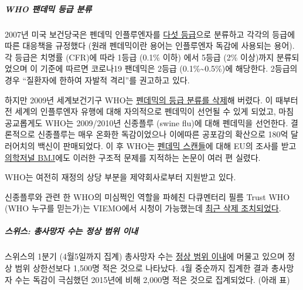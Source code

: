\hypertarget{who-uxd32cuxb370uxbbf9-uxb4f1uxae09-uxbd84uxb958}{%
\subparagraph{\texorpdfstring{\textbf{WHO 팬데믹 등급
분류}}{WHO 팬데믹 등급 분류}}\label{who-uxd32cuxb370uxbbf9-uxb4f1uxae09-uxbd84uxb958}}

2007년 미국 보건당국은 펜데믹 인플루엔자를
\href{https://www.forbes.com/2010/02/05/world-health-organization-swine-flu-pandemic-opinions-contributors-michael-fumento.html\#1806e16948e8}{다섯
등급}으로 분류하고 각각의 등급에 따른 대응책을 규정했다 (원래 펜데믹이란
용어는 인플루엔자 독감에 사용되는 용어). 각 등급은 치명률 (CFR)에 따라
1등급 (0.1\% 이하) 에서 5등급 (2\% 이상)까지 분류되었으며 이 기준에
따르면 코로나19 팬데믹은 2등급 (0.1\%\textasciitilde{}0.5\%)에 해당한다.
2등급의 경우 ``질환자에 한하여 자발적 격리''를 권고하고 있다.

하지만 2009년 세계보건기구 WHO는
\href{https://www.forbes.com/2010/02/05/world-health-organization-swine-flu-pandemic-opinions-contributors-michael-fumento.html\#1806e16948e8}{펜데믹의
등급 분류를 삭제}해 버렸다. 이 때부터 전 세계의 인플루엔자 유행에 대해
자의적으로 펜데믹이 선언될 수 있게 되었고, 마침 공교롭게도 WHO는
2009/2010년 신종플루 (swine flu)에 대해 펜데믹을 선언한다. 결론적으로
신종플루는 매우 온화한 독감이었으나 이에따른 공포감의 확산으로 180억
달러어치의 백신이 판매되었다. 이 후 WHO는
\href{https://healthcare-in-europe.com/en/news/european-parliament-to-investigate-who-pandemic-scandal.html}{펜데믹
스캔들}에 대해 EU의 조사를 받고
\href{https://www.bmj.com/content/340/bmj.c3033}{의학저널 BMJ}에도
이러한 구조적 문제를 지적하는 논문이 여러 편 실렸다. ~

WHO는 여전히 재정의 상당 부분을 제약회사로부터 지원받고 있다.

신종플루와 관련 한 WHO의 미심쩍인 역할을 파헤친 다큐멘터리 필름 Trust
WHO (WHO 누구를 믿는가)는 VIEMO에서 시청이 가능했는데
\href{https://www.youtube.com/watch?v=VjQGyqVN5RM}{최근 삭제
조치되었다}.

\hypertarget{uxc2a4uxc704uxc2a4-uxcd1duxc0acuxb9dduxc790-uxc218uxb294-uxc815uxc0c1-uxbc94uxc704-uxc774uxb0b4}{%
\subparagraph{\texorpdfstring{\textbf{스위스: 총사망자 수는 정상 범위
이내}}{스위스: 총사망자 수는 정상 범위 이내}}\label{uxc2a4uxc704uxc2a4-uxcd1duxc0acuxb9dduxc790-uxc218uxb294-uxc815uxc0c1-uxbc94uxc704-uxc774uxb0b4}}

스위스의 1분기 (4월5일까지 집계) 총사망자 수는
\href{https://swprs.files.wordpress.com/2020/04/ch-sterblichkeit-kumuliert-q1-2020.pdf}{정상
범위 이내}에 머물고 있으며 정상 범위 상한선보다 1,500명 적은 것으로
나타났다. 4월 중순까지 집계한 결과 총사망자 수는 독감이 극심했던
2015년에 비해 2,000명 적은 것으로 집계되었다. (아래 표)

